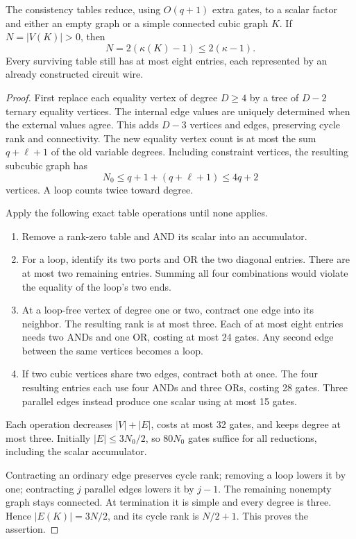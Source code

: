 \begin{lemma}
\label{lem:cubic-reduction}
The consistency tables reduce, using $O(q+1)$ extra gates, to a scalar
factor and either an empty graph or a simple connected cubic graph
$K$. If $N=|V(K)|>0$, then
\[
 N=2(\kappa(K)-1)\le2(\kappa-1).
\]
Every surviving table still has at most eight entries, each represented
by an already constructed circuit wire.
\end{lemma}
\begin{proof}
First replace each equality vertex of degree $D\ge4$ by a tree of
$D-2$ ternary equality vertices. The internal edge values are uniquely
determined when the external values agree. This adds $D-3$ vertices
and edges, preserving cycle rank and connectivity. The new equality
vertex count is at most the sum $q+\ell+1$ of the old variable degrees.
Including constraint vertices, the resulting subcubic graph has
\[
 N_0\le q+1+(q+\ell+1)\le4q+2
\]
vertices. A loop counts twice toward degree.

Apply the following exact table operations until none applies.
\begin{enumerate}
 \item Remove a rank-zero table and AND its scalar into an accumulator.
 \item For a loop, identify its two ports and OR the two diagonal
 entries. There are at most two remaining entries. Summing all four
 combinations would violate the equality of the loop's two ends.
 \item At a loop-free vertex of degree one or two, contract one edge
 into its neighbor. The resulting rank is at most three. Each of at
 most eight entries needs two ANDs and one OR, costing at most 24 gates.
 Any second edge between the same vertices becomes a loop.
 \item If two cubic vertices share two edges, contract both at once.
 The four resulting entries each use four ANDs and three ORs, costing
 28 gates. Three parallel edges instead produce one scalar using at
 most 15 gates.
\end{enumerate}
Each operation decreases $|V|+|E|$, costs at most 32 gates, and keeps
degree at most three. Initially $|E|\le3N_0/2$, so 80$N_0$ gates
suffice for all reductions, including the scalar accumulator.

Contracting an ordinary edge preserves cycle rank; removing a loop
lowers it by one; contracting $j$ parallel edges lowers it by $j-1$.
The remaining nonempty graph stays connected. At termination it is
simple and every degree is three. Hence $|E(K)|=3N/2$, and its cycle
rank is $N/2+1$. This proves the assertion.
\end{proof}

